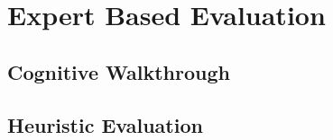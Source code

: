 \section{Expert Based Evaluation}
\subsection{Cognitive Walkthrough}
\subsection{Heuristic Evaluation}